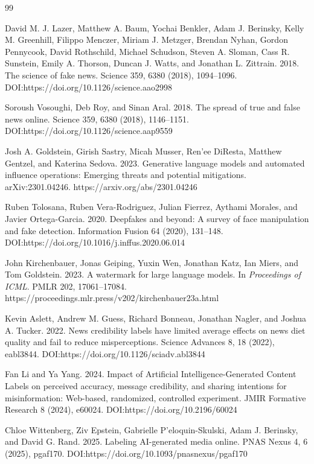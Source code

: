 \documentclass[acmlarge,screen,nonacm]{acmart}
\begin{document}
\begin{thebibliography}{99}

David M. J. Lazer, Matthew A. Baum, Yochai Benkler, Adam J. Berinsky, Kelly M. Greenhill, Filippo Menczer, Miriam J. Metzger, Brendan Nyhan, Gordon Pennycook, David Rothschild, Michael Schudson, Steven A. Sloman, Cass R. Sunstein, Emily A. Thorson, Duncan J. Watts, and Jonathan L. Zittrain. 2018. The science of fake news. Science 359, 6380 (2018), 1094--1096. DOI:https://doi.org/10.1126/science.aao2998

Soroush Vosoughi, Deb Roy, and Sinan Aral. 2018. The spread of true and false news online. Science 359, 6380 (2018), 1146--1151. DOI:https://doi.org/10.1126/science.aap9559

Josh A. Goldstein, Girish Sastry, Micah Musser, Ren'ee DiResta, Matthew Gentzel, and Katerina Sedova. 2023. Generative language models and automated influence operations: Emerging threats and potential mitigations. arXiv:2301.04246. https://arxiv.org/abs/2301.04246

Ruben Tolosana, Ruben Vera-Rodriguez, Julian Fierrez, Aythami Morales, and Javier Ortega-Garcia. 2020. Deepfakes and beyond: A survey of face manipulation and fake detection. Information Fusion 64 (2020), 131--148. DOI:https://doi.org/10.1016/j.inffus.2020.06.014

John Kirchenbauer, Jonas Geiping, Yuxin Wen, Jonathan Katz, Ian Miers, and Tom Goldstein. 2023. A watermark for large language models. In \emph{Proceedings of ICML}. PMLR 202, 17061--17084. https://proceedings.mlr.press/v202/kirchenbauer23a.html

Kevin Aslett, Andrew M. Guess, Richard Bonneau, Jonathan Nagler, and Joshua A. Tucker. 2022. News credibility labels have limited average effects on news diet quality and fail to reduce misperceptions. Science Advances 8, 18 (2022), eabl3844. DOI:https://doi.org/10.1126/sciadv.abl3844

Fan Li and Ya Yang. 2024. Impact of Artificial Intelligence-Generated Content Labels on perceived accuracy, message credibility, and sharing intentions for misinformation: Web-based, randomized, controlled experiment. JMIR Formative Research 8 (2024), e60024. DOI:https://doi.org/10.2196/60024

Chloe Wittenberg, Ziv Epstein, Gabrielle P'eloquin-Skulski, Adam J. Berinsky, and David G. Rand. 2025. Labeling AI-generated media online. PNAS Nexus 4, 6 (2025), pgaf170. DOI:https://doi.org/10.1093/pnasnexus/pgaf170


\end{thebibliography}
\end{document}

